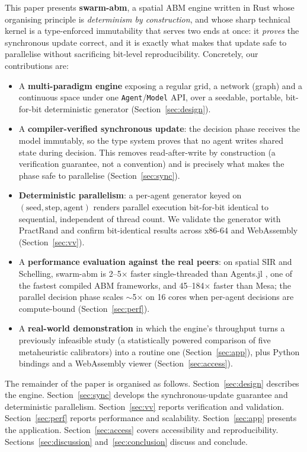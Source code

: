 \documentclass[review]{elsarticle}
\begin{document}
This paper presents \textbf{swarm-abm}, a spatial ABM engine written in Rust
whose organising principle is \emph{determinism by construction}, and whose
sharp technical kernel is a type-enforced immutability that serves two ends at
once: it \emph{proves} the synchronous update correct, and it is exactly what
makes that update safe to parallelise without sacrificing bit-level
reproducibility. Concretely, our contributions are:

\begin{itemize}
  \item A \textbf{multi-paradigm engine} exposing a regular grid, a network
  (graph) and a continuous space under one \texttt{Agent}/\texttt{Model} API,
  over a seedable, portable, bit-for-bit deterministic generator
  (Section~\ref{sec:design}).
  \item A \textbf{compiler-verified synchronous update}: the decision phase
  receives the model immutably, so the type system proves that no agent writes
  shared state during decision. This removes read-after-write by construction
  (a verification guarantee, not a convention) and is precisely what makes the
  phase safe to parallelise (Section~\ref{sec:sync}).
  \item \textbf{Deterministic parallelism}: a per-agent generator keyed on
  $(\text{seed},\text{step},\text{agent})$ renders parallel execution
  bit-for-bit identical to sequential, independent of thread count. We validate
  the generator with PractRand and confirm bit-identical results across x86-64
  and WebAssembly (Section~\ref{sec:vv}).
  \item A \textbf{performance evaluation against the real peers}: on spatial SIR
  and Schelling, swarm-abm is 2--5$\times$ faster single-threaded than
  Agents.jl \cite{datseris2022agents}, one of the fastest compiled ABM frameworks,
  and 45--184$\times$ faster than Mesa; the parallel decision phase scales
  $\sim$5$\times$ on 16 cores when per-agent decisions are compute-bound
  (Section~\ref{sec:perf}).
  \item A \textbf{real-world demonstration} in which the engine's throughput
  turns a previously infeasible study (a statistically powered comparison of
  five metaheuristic calibrators) into a routine one
  (Section~\ref{sec:app}), plus Python bindings and a WebAssembly viewer
  (Section~\ref{sec:access}).
\end{itemize}

The remainder of the paper is organised as follows.
Section~\ref{sec:design} describes the engine. Section~\ref{sec:sync} develops
the synchronous-update guarantee and deterministic parallelism.
Section~\ref{sec:vv} reports verification and validation.
Section~\ref{sec:perf} reports performance and scalability.
Section~\ref{sec:app} presents the application. Section~\ref{sec:access} covers
accessibility and reproducibility. Sections~\ref{sec:discussion}
and~\ref{sec:conclusion} discuss and conclude.
\end{document}
